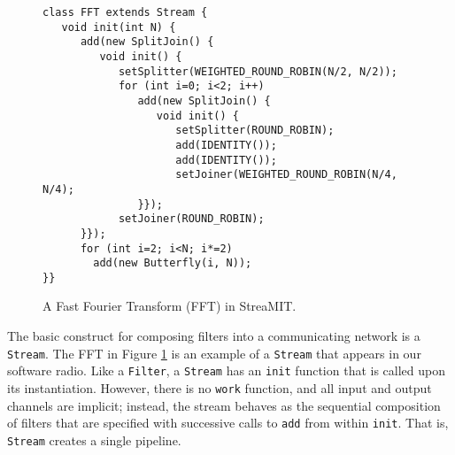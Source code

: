 \begin{figure}[t]
\scriptsize
\begin{verbatim}
class FFT extends Stream {
   void init(int N) {
      add(new SplitJoin() {
         void init() {
            setSplitter(WEIGHTED_ROUND_ROBIN(N/2, N/2));
            for (int i=0; i<2; i++) 
               add(new SplitJoin() {
                  void init() {
                     setSplitter(ROUND_ROBIN);
                     add(IDENTITY());
                     add(IDENTITY());
                     setJoiner(WEIGHTED_ROUND_ROBIN(N/4, N/4);
               }});
            setJoiner(ROUND_ROBIN);
      }});
      for (int i=2; i<N; i*=2)
        add(new Butterfly(i, N));
}}
\end{verbatim}
\vspace{-12pt}
\caption{\protect\small A Fast Fourier Transform (FFT) in StreaMIT.
\protect\label{fig:fft}}
\vspace{-12pt}
\end{figure}

The basic construct for composing filters into a communicating network
is a {\tt Stream}.  The FFT in Figure \ref{fig:fft} is an example of a
{\tt Stream} that appears in our software radio.  Like a {\tt Filter},
a {\tt Stream} has an {\tt init} function that is called upon its
instantiation.  However, there is no {\tt work} function, and all
input and output channels are implicit; instead, the stream behaves as
the sequential composition of filters that are specified with
successive calls to {\tt add} from within {\tt init}.  That is, {\tt
Stream} creates a single pipeline.

